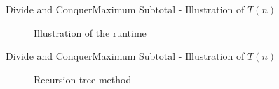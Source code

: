 


\begin{frame}{Divide and Conquer}{Maximum Subtotal - Illustration of $T(n)$}
  \begin{figure}
    \begin{adjustbox}{width=\linewidth}
      
    \end{adjustbox}
    \caption{Illustration of the runtime}
    \label{fig:divide_and_conquer:max_sub_array_runtime}
  \end{figure}
\end{frame}


\begin{frame}{Divide and Conquer}{Maximum Subtotal - Illustration of $T(n)$}
  \begin{figure}
    \begin{adjustbox}{width=\linewidth}
      
    \end{adjustbox}
    \caption{Recursion tree method}
    \label{fig:divide_and_conquer:max_sub_array_runtime_tree}
  \end{figure}
\end{frame}

